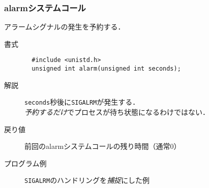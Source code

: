 \documentclass{beamer}                 %
\begin{document}
\begin{frame}[fragile]
  \frametitle{alarmシステムコール}
  アラームシグナルの発生を予約する．

  \begin{description}
  \item[書式]
\begin{verbatim}
  #include <unistd.h>
  unsigned int alarm(unsigned int seconds);
\end{verbatim}

  \item[解説]
    \texttt{seconds}秒後に\texttt{SIGALRM}が発生する．\\
    \emph{予約するだけ}でプロセスが待ち状態になるわけではない．

  \item[戻り値]
    前回のalarmシステムコールの残り時間（通常0）
  
  \item[プログラム例] \texttt{SIGALRM}のハンドリングを\emph{捕捉}にした例
  \end{description}
\end{frame}
\end{document}
